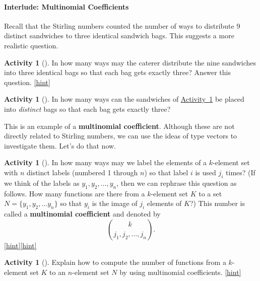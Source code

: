 \documentclass[10pt,]{book}
\newcommand{\terminology}[1]{\textbf{#1}}
\theoremstyle{plain}
\theoremstyle{definition}
\theoremstyle{definition}
\theoremstyle{definition}
\newtheorem{activity}[project]{Activity}
\numberwithin{equation}{chapter}
\begin{document}
\paragraph[{Interlude: Multinomial Coefficients}]{Interlude: Multinomial Coefficients}\hypertarget{pars-multinomial}{}
\hypertarget{p-1419}{}%
Recall that the Stirling numbers counted the number of ways to distribute 9 distinct sandwiches to three identical sandwich bags.  This suggests a more realistic question.%
\begin{activity}[]\label{caterer2}
\hypertarget{p-1420}{}%
In how many ways may the caterer distribute the nine sandwiches into three identical bags so that each bag gets exactly three? Answer this question.%
\hfill{\tiny\hyperlink{a-279}{[hint]}\hypertarget{q-279}{}}\end{activity}
\begin{activity}[]\label{activity-273}
\hypertarget{p-1423}{}%
In how many ways can the sandwiches of \hyperref[caterer2]{Activity~\ref{caterer2}} be placed into \emph{distinct} bags so that each bag gets exactly three?%
\end{activity}
\hypertarget{p-1426}{}%
This is an example of a \terminology{multinomial coefficient}.  Although these are not directly related to Stirling numbers, we can use the ideas of type vectors to investigate them.  Let's do that now.%
\begin{activity}[]\label{activity-274}
\hypertarget{p-1427}{}%
In how many ways may we label the elements of a \(k\)-element set with \(n\) distinct labels (numbered 1 through \(n\)) so that label \(i\) is used \(j_i\) times? (If we think of the labels as \(y_1, y_2, \ldots, y_n\), then we can rephrase this question as follows.  How many functions are there from a \(k\)-element set \(K\) to a set \(N=\{y_1,y_2,\ldots y_n\}\) so that \(y_i\) is the image of \(j_i\) elements of \(K\)?) This number is called a \terminology{multinomial coefficient} and denoted by%
\begin{equation*}
\binom{k}{j_1,j_2,\ldots, j_n}.
\end{equation*}
%
\hfill{\tiny\hyperlink{a-281}{[hint]}\hypertarget{q-281}{}}\hfill{\tiny\hyperlink{a-281}{[hint]}\hypertarget{q-281}{}}\end{activity}
\begin{activity}[]\label{activity-275}
\hypertarget{p-1431}{}%
Explain how to compute the number of functions from a \(k\)-element set \(K\) to an \(n\)-element set \(N\) by using multinomial coefficients.%
\hfill{\tiny\hyperlink{a-282}{[hint]}\hypertarget{q-282}{}}\end{activity}
\end{document}
